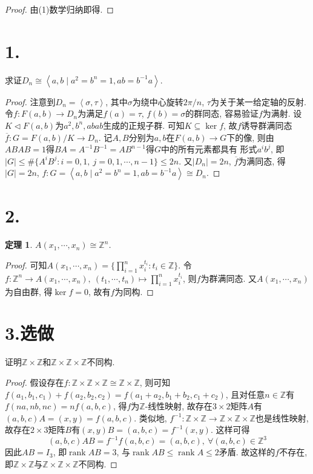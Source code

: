 \documentclass[12pt, a4paper, fontset=windows]{ctexart}
\newcommand{\Z}{\mathbb{Z}}
\newcommand{\abs}[1]{\left|{#1}\right|}
\newcommand{\cl}[1]{\overline{#1}} %
\newcommand{\gen}[1]{\left\langle{#1}\right\rangle}
\newcommand{\isom}{\cong} %
\newcommand{\rank}{\operatorname{rank}}
\newcommand{\xuan}{{\normalsize 选做}}
\newtheorem*{theorem}{定理}
\begin{document}
\begin{proof}
由(1)数学归纳即得. 
\end{proof}

\section*{1.}

求证$D_n\isom\gen{a,b\mid a^2=b^n=1,ab=b^{-1}a}$. 

\begin{proof}
注意到$D_n=\gen{\sigma,\tau}$, 其中$\sigma$为绕中心旋转$2\pi/n$, 
$\tau$为关于某一给定轴的反射. 令$f:F(a,b)\to D_n$为满足$f(a)=\tau$, $f(b)=\sigma$的群同态, 
容易验证$f$为满射. 设$K\lhd F(a,b)$为$a^2,b^n,abab$生成的正规子群. 
可知$K\subseteq\ker f$, 故$f$诱导群满同态$\cl{f}:G=F(a,b)/K\to D_n$. 
记$A,B$分别为$a,b$在$F(a,b)\to G$下的像, 
则由$ABAB=1$得$BA=A^{-1}B^{-1}=AB^{n-1}$得$G$中的所有元素都具有
形式$a^ib^j$, 即$\abs{G}\le\#\{A^iB^j:i=0,1,\ j=0,1,\cdots,n-1\}\le 2n$. 
又$\abs{D_n}=2n$, $\cl{f}$为满同态, 得$\abs{G}=2n$, 
$f:G=\gen{a,b\mid a^2=b^n=1,ab=b^{-1}a}\isom D_n$. 
\end{proof}

\section*{2.}

\begin{theorem}
$A(x_1,\cdots,x_n)\isom\Z^n$. 
\end{theorem}

\begin{proof}
可知$A(x_1,\cdots,x_n)=\{\prod^n_{i=1}x_i^{t_i}:t_i\in\Z\}$. 
令$f:\Z^n\to A(x_1,\cdots,x_n),\ (t_1,\cdots,t_n)\mapsto\prod^n_{i=1}x_i^{t_i}$, 
则$f$为群满同态. 又$A(x_1,\cdots,x_n)$为自由群, 得$\ker f=0$, 故有$f$为同构. 
\end{proof}

\section*{3.\xuan}

证明$\Z\times\Z$和$\Z\times\Z\times\Z$不同构. 

\begin{proof}
假设存在$f:\Z\times\Z\times\Z\isom\Z\times\Z$, 
则可知$f(a_1,b_1,c_1)+f(a_2,b_2,c_2)=f(a_1+a_2,b_1+b_2,c_1+c_2)$, 
且对任意$n\in\Z$有$f(na,nb,nc)=nf(a,b,c)$, 得$f$为$\Z$-线性映射, 
故存在$3\times 2$矩阵$A$有$(a,b,c)A=(x,y)=f(a,b,c)$. 
类似地, $f^{-1}:\Z\times\Z\to\Z\times\Z\times\Z$也是线性映射, 
故存在$2\times 3$矩阵$B$有$(x,y)B=(a,b,c)=f^{-1}(x,y)$. 这样可得
\[(a,b,c)AB=f^{-1}f(a,b,c)=(a,b,c),\ \forall(a,b,c)\in\Z^3\]
因此$AB=I_3$, 即$\rank AB=3$, 与$\rank AB\le\rank A\le 2$矛盾. 
故这样的$f$不存在, 即$\Z\times\Z$与$\Z\times\Z\times\Z$不同构. 
\end{proof}
\end{document}
